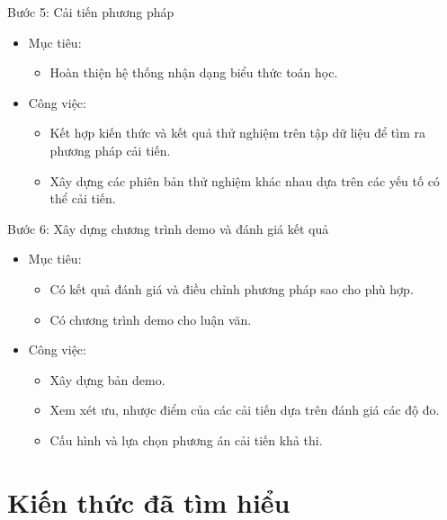 \documentclass[a4paper,12pt]{article}
\begin{document}
	Bước 5: Cải tiến phương pháp
	\begin{itemize}
		\item Mục tiêu:
		\begin{itemize}
			\item Hoàn thiện hệ thống nhận dạng biểu thức toán học.
		\end{itemize}
		\item Công việc:
		\begin{itemize}
			\item Kết hợp kiến thức và kết quả thử nghiệm trên tập dữ liệu để tìm ra phương pháp cải tiến.
			\item Xây dựng các phiên bản thử nghiệm khác nhau dựa trên các yếu tố có thể cải tiến.
			
		\end{itemize}
	\end{itemize}
	Bước 6: Xây dựng chương trình demo và đánh giá kết quả
	\begin{itemize}
		\item Mục tiêu:
		\begin{itemize}
			\item Có kết quả đánh giá và điều chỉnh phương pháp sao cho phù hợp.
			\item Có chương trình demo cho luận văn.
		\end{itemize}
		\item Công việc:
		\begin{itemize}
			\item Xây dựng bản demo.
			\item Xem xét ưu, nhược điểm của các cải tiến dựa trên đánh giá các độ đo.
			\item Cấu hình và lựa chọn phương án cải tiến khả thi. 
		\end{itemize}
	\end{itemize}
	
	
	
	
	\newpage
	\section{Kiến thức đã tìm hiểu}
	
\end{document}
